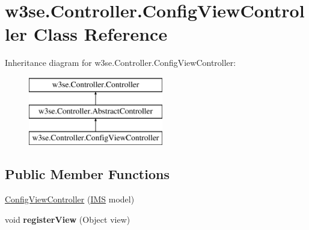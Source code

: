 \hypertarget{classw3se_1_1_controller_1_1_config_view_controller}{\section{w3se.\-Controller.\-Config\-View\-Controller Class Reference}
\label{classw3se_1_1_controller_1_1_config_view_controller}
}
Inheritance diagram for w3se.\-Controller.\-Config\-View\-Controller\-:\begin{figure}[H]
\begin{center}
\leavevmode
\includegraphics[height=3.000000cm]{classw3se_1_1_controller_1_1_config_view_controller}
\end{center}
\end{figure}
\subsection*{Public Member Functions}
\begin{DoxyCompactItemize}
\item 
\hyperlink{classw3se_1_1_controller_1_1_config_view_controller_a810c0a777c604174af90b0ff03526fdf}{Config\-View\-Controller} (\hyperlink{classw3se_1_1_model_1_1_i_m_s}{I\-M\-S} model)
\item 
\hypertarget{classw3se_1_1_controller_1_1_config_view_controller_a4f0ac4a66a40f7950c329295ed603fee}{void {\bfseries register\-View} (Object view)}\label{classw3se_1_1_controller_1_1_config_view_controller_a4f0ac4a66a40f7950c329295ed603fee}

\end{DoxyCompactItemize}
